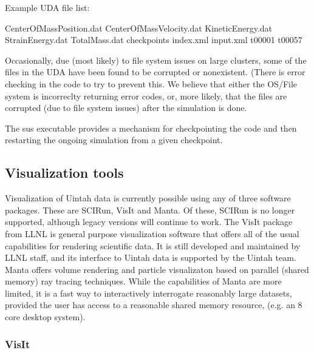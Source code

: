 Example UDA file list:

CenterOfMassPosition.dat
CenterOfMassVelocity.dat
KineticEnergy.dat
StrainEnergy.dat
TotalMass.dat
checkpoints
index.xml
input.xml
t00001
t00057


Occasionally, due (most likely) to file system issues on large
clusters, some of the files in the UDA have been found to be corrupted
or nonexistent.  (There is error checking in the code to try to
prevent this.  We believe that either the OS/File system is
incorreclty returning error codes, or, more likely, that the files are
corrupted (due to file system issues) after the simulation is done.


The sus executable provides a mechanism for checkpointing the code and
then restarting the ongoing simulation from a given checkpoint. 



\subsection{Visualization tools}

Visualization of Uintah data is currently possible using any of three
software packages.  These are SCIRun, VisIt and Manta.  Of these, SCIRun is
no longer supported, although legacy versions will continue to work.  The
VisIt package from LLNL is general purpose visualization software that offers
all of the usual capabilities for rendering scientific data.  It is still
developed and maintained by LLNL staff, and its interface to Uintah data is
supported by the Uintah team.  Manta offers volume rendering and particle
visualizaton based on parallel (shared memory) ray tracing techniques.
While the capabilities of Manta are more limited, it is a fast way to
interactively interrogate reasonably large datasets, provided the user has
access to a reasonable shared memory resource, (e.g. an 8 core desktop system).

\subsubsection{VisIt}

